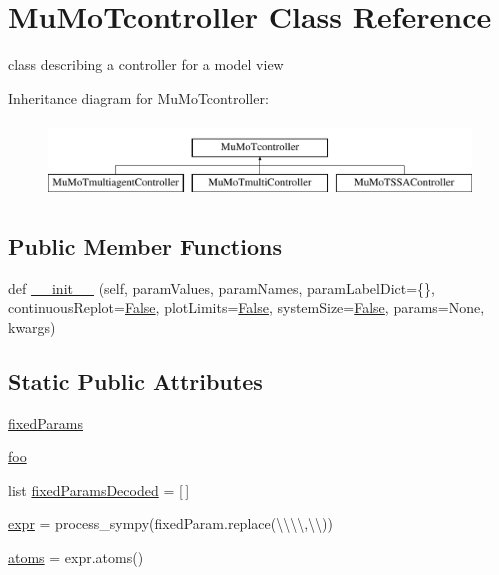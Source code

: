 \hypertarget{class_mu_mo_t_1_1_mu_mo_t_1_1_mu_mo_tcontroller}{}\section{Mu\+Mo\+Tcontroller Class Reference}
\label{class_mu_mo_t_1_1_mu_mo_t_1_1_mu_mo_tcontroller}


class describing a controller for a model view  


Inheritance diagram for Mu\+Mo\+Tcontroller\+:\begin{figure}[H]
\begin{center}
\leavevmode
\includegraphics[height=2.000000cm]{class_mu_mo_t_1_1_mu_mo_t_1_1_mu_mo_tcontroller}
\end{center}
\end{figure}
\subsection*{Public Member Functions}
\begin{DoxyCompactItemize}
\item 
def \hyperlink{class_mu_mo_t_1_1_mu_mo_t_1_1_mu_mo_tcontroller_a2b7e9681302740635162f2f8f0dddebf}{\+\_\+\+\_\+init\+\_\+\+\_\+} (self, param\+Values, param\+Names, param\+Label\+Dict=\{\}, continuous\+Replot=\hyperlink{namespace_mu_mo_t_1_1_mu_mo_t_a36cde68b055f3f2ee671020af4ccf4e2}{False}, plot\+Limits=\hyperlink{namespace_mu_mo_t_1_1_mu_mo_t_a36cde68b055f3f2ee671020af4ccf4e2}{False}, system\+Size=\hyperlink{namespace_mu_mo_t_1_1_mu_mo_t_a36cde68b055f3f2ee671020af4ccf4e2}{False}, params=None, kwargs)
\end{DoxyCompactItemize}
\subsection*{Static Public Attributes}
\begin{DoxyCompactItemize}
\item 
\hyperlink{class_mu_mo_t_1_1_mu_mo_t_1_1_mu_mo_tcontroller_a7018be3799b9e7cec083030398c0530f}{fixed\+Params}
\item 
\hyperlink{class_mu_mo_t_1_1_mu_mo_t_1_1_mu_mo_tcontroller_afdba98970961edb29f88241b9d99d890}{foo}
\item 
list \hyperlink{class_mu_mo_t_1_1_mu_mo_t_1_1_mu_mo_tcontroller_a8ae52d3e73fa16e877bf17d4af74c80d}{fixed\+Params\+Decoded} = \mbox{[}$\,$\mbox{]}
\item 
\hyperlink{class_mu_mo_t_1_1_mu_mo_t_1_1_mu_mo_tcontroller_a0358810928b8858d2b7cbfc344ba792a}{expr} = process\+\_\+sympy(fixed\+Param.\+replace(\textquotesingle{}\textbackslash{}\textbackslash{}\textbackslash{}\textbackslash{}\textquotesingle{},\textquotesingle{}\textbackslash{}\textbackslash{}\textquotesingle{}))
\item 
\hyperlink{class_mu_mo_t_1_1_mu_mo_t_1_1_mu_mo_tcontroller_a1e15bdfe806c9eac0e6af33fa402bdde}{atoms} = expr.\+atoms()
\end{DoxyCompactItemize}
